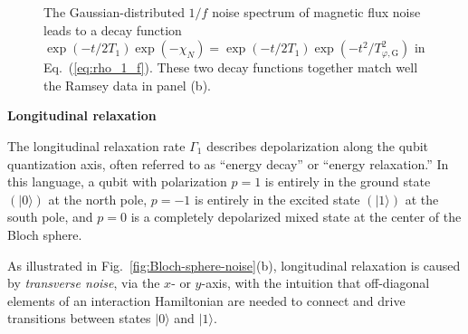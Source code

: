 \documentclass[aip,apr,twocolumn,showpacs,superscriptaddress,groupedaddress,nofootinbib,reprint]{revtex4-1}  %
\begin{document}
\begin{figure}[!t]
{    The Gaussian-distributed $1/f$ noise spectrum of magnetic flux noise leads to a decay function $\exp(-t/2T_1)\exp(-\chi_N) = \exp (-t/2T_1) \exp(-t^2/T_{\varphi,\mathrm{G}}^2)$ in Eq.~(\ref{eq:rho_1_f}). These two decay functions together match well the Ramsey data in panel (b).}
\label{fig:T1-T2}
\end{figure}

\noindent \textbf{Longitudinal relaxation}

The longitudinal relaxation rate $\Gamma_1$ describes depolarization along the qubit quantization axis, often referred to as ``energy decay'' or ``energy relaxation.'' In this language, a qubit with polarization $p=1$ is entirely in the ground state $(\lvert0\rangle)$ at the north pole, $p=-1$ is entirely in the excited state $(\lvert1\rangle)$ at the south pole, and $p=0$ is a completely depolarized mixed state at the center of the Bloch sphere.

As illustrated in Fig.~\ref{fig:Bloch-sphere-noise}(b), longitudinal relaxation is caused by {\em transverse noise}, via the $x$- or $y$-axis, with the intuition that off-diagonal elements of an interaction Hamiltonian are needed to connect and drive transitions between states $|0\rangle$ and $|1 \rangle$.
\end{document}
